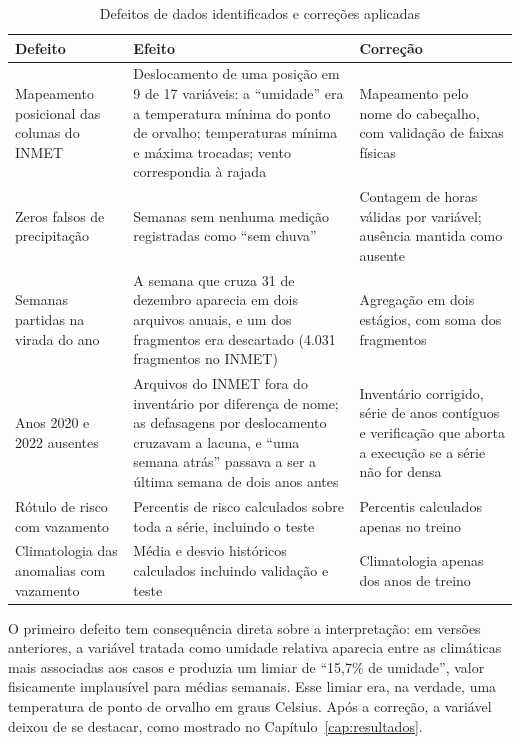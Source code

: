 \begin{table}[htb]
\centering
\caption{Defeitos de dados identificados e correções aplicadas}
\label{tab:correcoes}
\small
\begin{tabular}{|p{}|p{}|p{}|}
\hline
\textbf{Defeito} & \textbf{Efeito} & \textbf{Correção} \\ \hline
Mapeamento posicional das colunas do INMET & Deslocamento de uma posição em 9 de 17 variáveis: a ``umidade'' era a temperatura mínima do ponto de orvalho; temperaturas mínima e máxima trocadas; vento correspondia à rajada & Mapeamento pelo nome do cabeçalho, com validação de faixas físicas \\ \hline
Zeros falsos de precipitação & Semanas sem nenhuma medição registradas como ``sem chuva'' & Contagem de horas válidas por variável; ausência mantida como ausente \\ \hline
Semanas partidas na virada do ano & A semana que cruza 31 de dezembro aparecia em dois arquivos anuais, e um dos fragmentos era descartado (4.031 fragmentos no INMET) & Agregação em dois estágios, com soma dos fragmentos \\ \hline
Anos 2020 e 2022 ausentes & Arquivos do INMET fora do inventário por diferença de nome; as defasagens por deslocamento cruzavam a lacuna, e ``uma semana atrás'' passava a ser a última semana de dois anos antes & Inventário corrigido, série de anos contíguos e verificação que aborta a execução se a série não for densa \\ \hline
Rótulo de risco com vazamento & Percentis de risco calculados sobre toda a série, incluindo o teste & Percentis calculados apenas no treino \\ \hline
Climatologia das anomalias com vazamento & Média e desvio históricos calculados incluindo validação e teste & Climatologia apenas dos anos de treino \\ \hline
\end{tabular}
\end{table}

O primeiro defeito tem consequência direta sobre a interpretação: em versões anteriores, a variável tratada como umidade relativa aparecia entre as climáticas mais associadas aos casos e produzia um limiar de ``15,7\% de umidade'', valor fisicamente implausível para médias semanais. Esse limiar era, na verdade, uma temperatura de ponto de orvalho em graus Celsius. Após a correção, a variável deixou de se destacar, como mostrado no Capítulo~\ref{cap:resultados}.

